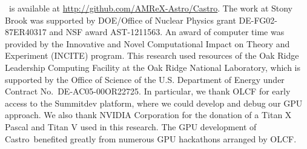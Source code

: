 \documentclass[preprint,times]{aastex62}
\newcommand{\castro}{{\sf Castro}}
\begin{document}


\acknowledgements \castro\ is available at
\url{http://github.com/AMReX-Astro/Castro}.  The work at Stony Brook
was supported by DOE/Office of Nuclear Physics grant DE-FG02-87ER40317
and NSF award AST-1211563.  An award of computer time was provided by
the Innovative and Novel Computational Impact on Theory and Experiment
(INCITE) program.  This research used resources of the Oak Ridge
Leadership Computing Facility at the Oak Ridge National Laboratory,
which is supported by the Office of Science of the U.S. Department of
Energy under Contract No.\ DE-AC05-00OR22725.  In particular, we thank
OLCF for early access to the Summitdev platform, where we could
develop and debug our GPU approach.  We also thank NVIDIA Corporation
for the donation of a Titan X Pascal and Titan V used in this
research.  The GPU development of \castro\ benefited greatly from
numerous GPU hackathons arranged by OLCF.







\end{document}
